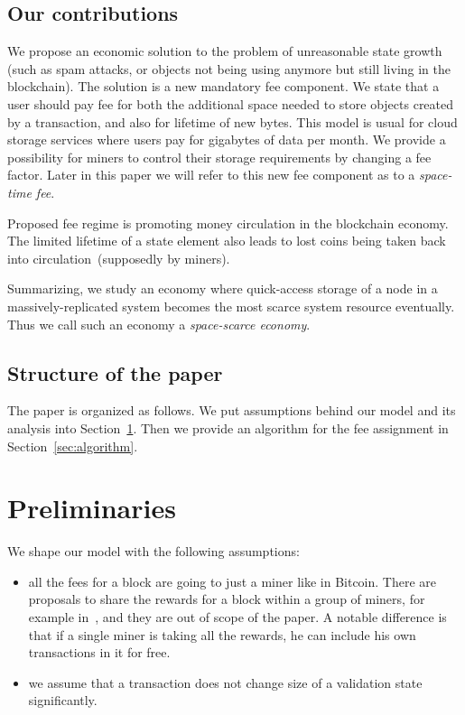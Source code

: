 \documentclass[]{llncs}   %
\newcommand{\authnote}[2]{\marginpar{\parbox{\marginparwidth}{\tiny %
  \textsf{#1 {\textcolor{blue}{notes: #2}}}}}%
  \textcolor{blue}{\textbf{\dag}}}
\newcommand{\authnote}[2]{
  \textsf{#1\textcolor{blue}{ #2}}}
\newcommand{\authnote}[2]{}
\newcommand{\knote}[1]{{\authnote{\textcolor{green}{Alex notes:}}{#1}}}
\begin{document}
\subsection{Our contributions}

We propose an economic solution to the problem of unreasonable state growth
(such as spam attacks, or objects not being using anymore but still living in
the blockchain). The solution is a new mandatory fee component. We state that a
user should pay fee for both the additional space needed to store objects
created by a transaction, and also for lifetime of new bytes. This model is
usual for cloud storage services where users pay for gigabytes of data per
month. We provide a possibility for miners to control their storage requirements
by changing a fee factor. Later in this paper we will refer to this new fee
component as to a {\em space-time fee}.

\knote{write abt fee adjustment rule}

Proposed fee regime is promoting money circulation in the blockchain economy.
The limited lifetime of a state element also leads to lost coins being taken
back into circulation~(supposedly by miners). 

Summarizing, we study an economy where quick-access storage of a node in a
massively-replicated system becomes the most scarce system resource eventually.
Thus we call such an economy a {\em space-scarce economy}.

\subsection{Structure of the paper}
The paper is organized as follows. We put assumptions behind our model and its analysis into Section~\ref{sec:preliminaries}. Then we provide an algorithm for the fee assignment in Section~\ref{sec:algorithm}. \knote{todo: finish}


\section{Preliminaries}
\label{sec:preliminaries}

We shape our model with the following assumptions: 
\begin{itemize}
  \item{} all the fees for a block are going to just a miner like in Bitcoin.
      There are proposals to share the rewards for a block within a group of
      miners, for example in~\cite{eyal2016bitcoin,kogias2016enhancing}, and
      they are out of scope of the paper. A notable difference is that if a single miner
      is taking all the rewards, he can include his own transactions in it for free.
  \item{} we assume that a transaction does not change size of a validation state significantly.
\end{itemize}
\end{document}
